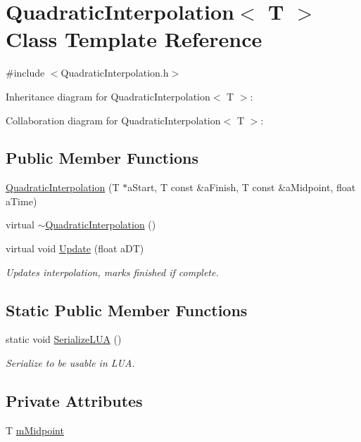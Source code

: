 \hypertarget{classQuadraticInterpolation}{}\section{Quadratic\+Interpolation$<$ T $>$ Class Template Reference}
\label{classQuadraticInterpolation}


{\ttfamily \#include $<$Quadratic\+Interpolation.\+h$>$}



Inheritance diagram for Quadratic\+Interpolation$<$ T $>$\+:


Collaboration diagram for Quadratic\+Interpolation$<$ T $>$\+:
\subsection*{Public Member Functions}
\begin{DoxyCompactItemize}
\item 
\hyperlink{classQuadraticInterpolation_addd0f72b53a3a96cc3f395169c49b744}{Quadratic\+Interpolation} (T $\ast$a\+Start, T const \&a\+Finish, T const \&a\+Midpoint, float a\+Time)
\item 
virtual \hyperlink{classQuadraticInterpolation_a1818ab0e2b53b45f2c8a9da117ff8721}{$\sim$\+Quadratic\+Interpolation} ()
\item 
virtual void \hyperlink{classQuadraticInterpolation_a87b29721b198b9ff533f9808dcd08c5e}{Update} (float a\+DT)
\begin{DoxyCompactList}\small\item\em Updates interpolation, marks finished if complete. \end{DoxyCompactList}\end{DoxyCompactItemize}
\subsection*{Static Public Member Functions}
\begin{DoxyCompactItemize}
\item 
static void \hyperlink{classQuadraticInterpolation_ac704c064043aef8cb452a6c55c793ab2}{Serialize\+L\+UA} ()
\begin{DoxyCompactList}\small\item\em Serialize to be usable in L\+UA. \end{DoxyCompactList}\end{DoxyCompactItemize}
\subsection*{Private Attributes}
\begin{DoxyCompactItemize}
\item 
T \hyperlink{classQuadraticInterpolation_a18be058d9d18b98195b6a1fcb25ec1c0}{m\+Midpoint}
\end{DoxyCompactItemize}
